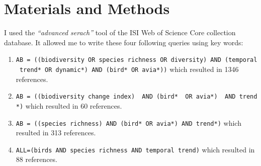 \documentclass[
  12pt,
  oneside]{report}
\begin{document}
\hypertarget{materials-and-methods}{%
\chapter{Materials and Methods}\label{materials-and-methods}}

I used the \emph{\enquote{advanced serach}} tool of the ISI Web of Science Core collection database. It allowed me to write these four following queries using key words:

\begin{enumerate}
\def\labelenumi{\arabic{enumi}.}
\item
  \texttt{AB\ =\ ((biodiversity\ OR\ species\ richness\ OR\ diversity)\ AND\ (temporal\ trend*\ OR\ dynamic*)\ AND\ (bird*\ OR\ avia*))} which resulted in 1346 references.
\item
  \texttt{AB\ =\ ((biodiversity\ change\ index)\ \ AND\ (bird*\ \ OR\ avia*)\ \ AND\ trend*)} which resulted in 60 references.
\item
  \texttt{AB\ =\ ((species\ richness)\ AND\ (bird*\ OR\ avia*)\ AND\ trend*)} which resulted in 313 references.
\item
  \texttt{ALL=(birds\ AND\ species\ richness\ AND\ temporal\ trend)} which resulted in 88 references.
\end{enumerate}

\begingroup\fontsize{10}{12}\selectfont
\end{document}
